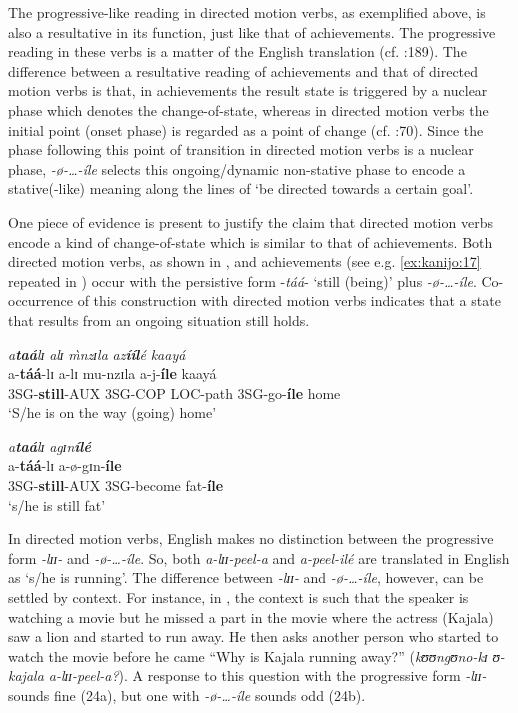 \documentclass[output=paper,newtxmath,modfonts,nonflat,draftmode]{langsci/langscibook}
\begin{document}
The progressive-like reading in directed motion verbs, as exemplified above, is also a resultative in its function, just like that of achievements. The progressive reading in these verbs is a matter of the English translation (cf. \citealt{Ebert1995}:189). The difference between a resultative reading of achievements and that of directed motion verbs is that, in achievements the result state is triggered by a nuclear phase which denotes the change-of-state, whereas in directed motion verbs the initial point (onset phase) is regarded as a point of change (cf. \citealt{Smith1991}:70). Since the phase following this point of transition in directed motion verbs is a nuclear phase, \textit{-ø}\textit{-…-íle} selects this ongoing/dynamic non-stative phase to encode a stative(-like) meaning along the lines of ‘be directed towards a certain goal’. 

One piece of evidence is present to justify the claim that directed motion verbs encode a kind of change-of-state which is similar to that of achievements. Both directed motion verbs, as shown in , and achievements (see e.g. \ref{ex:kanijo:17} repeated in ) occur with the persistive form -\textit{táá}- ‘still (being)’ plus \textit{-ø}\textit{-…-íle}. Co-occurrence of this construction with directed motion verbs indicates that a state that results from an ongoing situation still holds.

\ea \label{ex:kanijo:22}
\glll \textit{a}\textbf{\textit{taá}}\textit{lɪ}  \textit{alɪ}  \textit{\`{m}nz}\textit{ɪla}  \textit{az}\textbf{\textit{ííl}}\textit{é} \textit{kaayá}\\
  a-\textbf{táá}-lɪ           a-lɪ           mu-nzɪla  a-j-\textbf{íle}        kaayá\\
  3SG-\textbf{still}-AUX 3SG-COP LOC-path 3SG-go-\textbf{íle} home\\
\glt   ‘S/he is on the way (going) home’
\z

\ea \label{ex:kanijo:23}
\glll \textit{a}\textbf{\textit{taá}}\textit{lɪ}              \textit{agɪ}\textit{n}\textbf{\textit{ílé}} \\
  a-\textbf{táá}-lɪ            a-ø-gɪn-\textbf{íle}\\
  3SG-\textbf{still}-AUX 3SG-become fat-\textbf{íle}\\
\glt   ‘s/he is still fat’
\z


In directed motion verbs, English makes no distinction between the progressive form \textit{-lɪɪ}\textit{-} and \textit{-ø}\textit{-…-íle}. So, both \textit{a-lɪɪ}\textit{-peel-a} and \textit{a-peel-ilé} are translated in English as ‘s/he is running’. The difference between \textit{-lɪɪ}\textit{-} and \textit{-ø}\textit{-…-íle}, however, can be settled by context. For instance, in , the context is such that the speaker is watching a movie but he missed a part in the movie where the actress (Kajala) saw a lion and started to run away. He then asks another person who started to watch the movie before he came “Why is Kajala running away?” (\textit{kʊʊ}\textit{ngʊ}\textit{no-kɪ} \textit{ʊ}\textit{-kajala a-l}\textit{ɪɪ-peel-a?}). A response to this question with the progressive form \textit{-lɪɪ}\textit{-} sounds fine (24a), but one with \textit{-ø}\textit{-…-íle} sounds odd (24b). 
\end{document}
